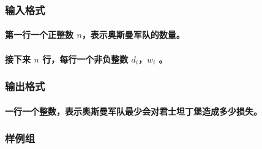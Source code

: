\documentclass[final,11pt,oneside,UTF8]{report}
\begin{document}
\subsubsection{输入格式}
\paragraph{
    第一行一个正整数 $n$，表示奥斯曼军队的数量。
}
\paragraph{
    接下来 $n$ 行，每行一个非负整数 $d_i$，$w_i$ 。
}
\subsubsection{输出格式}
\paragraph{
    一行一个整数，表示奥斯曼军队最少会对君士坦丁堡造成多少损失。
}
\subsubsection{样例组}
\end{document}
